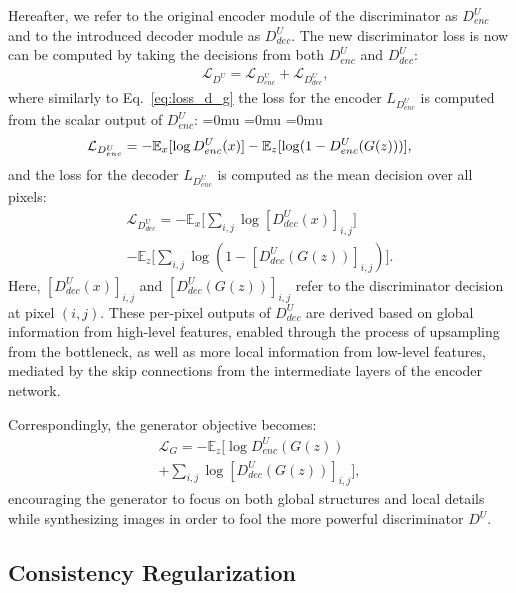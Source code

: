 \documentclass[10pt,twocolumn,letterpaper]{article}
\begin{document}
Hereafter, we refer to the original encoder module of the discriminator as $D^{U}_{enc}$ and to the introduced decoder module as $D^{U}_{dec}$. The new discriminator loss is now can be computed by taking the decisions from both $D^{U}_{enc}$ and $D^{U}_{dec}$:
\begin{align}
& \mathcal{L}_{D^U}  = \mathcal{L}_{D^U_{enc}} + \mathcal{L}_{D^U_{dec}}, \label{eq:loss_d_u}
\end{align}
where similarly to Eq.~\ref{eq:loss_d_g} the loss for the encoder ${L}_{D^U_{enc}}$ is computed from the scalar output of $D^U_{enc}$:
{\medmuskip=0mu
\thinmuskip=0mu
\thickmuskip=0mu
\begin{align}
&\hspace{-0.5em}\mathcal{L}_{D^U_{enc}}= -\mathbb{E}_x[\log D^U_{enc}(x)]- \mathbb{E}_z[\log (1-D^U_{enc}(G(z)))],\label{eq:loss_d_u_enc}
\end{align} }and the loss for the decoder ${L}_{D^U_{enc}}$ is computed as the mean decision over all pixels:
\begin{multline}
\mathcal{L}_{D^U_{dec}} = -\mathbb{E}_x\Big[\sum_{i,j}\log [D^U_{dec}(x)]_{i,j}\Big] \\
- \mathbb{E}_z\Big[\sum_{i,j}\log (1-[D^U_{dec}(G(z))]_{i,j})\Big]. \label{eq:loss_d_u_dec}
\end{multline}
Here, $[D^U_{dec}(x)]_{i,j}$ and $[D^U_{dec}(G(z))]_{i,j}$ refer to the discriminator decision at pixel $(i,j)$.  These per-pixel outputs of $D^U_{dec}$ are derived based on global information from high-level features, enabled through the process of upsampling from the bottleneck, as well as more local information from low-level features, mediated by the skip connections from the intermediate layers of the encoder network.

Correspondingly, the generator objective becomes:
\begin{multline}
\mathcal{L}_{G} =  -\mathbb{E}_z\Big[\log D^U_{enc}(G(z))  \\
+ \sum_{i,j}\log [D^U_{dec}(G(z))]_{i,j}\Big],  \label{eq:loss_g_u}
\end{multline}
encouraging the generator to focus on both global structures and local details while synthesizing images in order to fool the more powerful discriminator $D^U$.











\subsection{Consistency Regularization} \label{subsec:method-cutmix}
\end{document}
